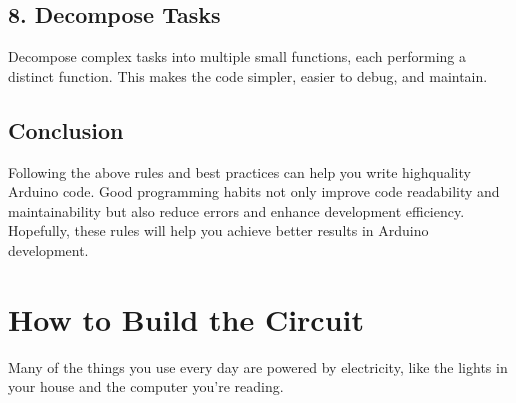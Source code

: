 \documentclass[a4paper,11pt,english]{sphinxmanual}
\begin{document}
\subsection{8. Decompose Tasks}
\label{\detokenize{Get_Started_with_Arduino/Sketch_Writing_Rules:decompose-tasks}}
\sphinxAtStartPar
Decompose complex tasks into multiple small functions, each performing a distinct function. This makes the code simpler, easier to debug, and maintain.

\begin{sphinxVerbatim}[commandchars=\\\{\}]


\end{sphinxVerbatim}


\subsection{Conclusion}
\label{\detokenize{Get_Started_with_Arduino/Sketch_Writing_Rules:conclusion}}
\sphinxAtStartPar
Following the above rules and best practices can help you write high\sphinxhyphen{}quality Arduino code. Good programming habits not only improve code readability and maintainability but also reduce errors and enhance development efficiency. Hopefully, these rules will help you achieve better results in Arduino development.

\sphinxstepscope


\section{How to Build the Circuit}
\label{\detokenize{Get_Started_with_Arduino/How_to_Build_the_Circuit:how-to-build-the-circuit}}\label{\detokenize{Get_Started_with_Arduino/How_to_Build_the_Circuit::doc}}
\sphinxAtStartPar
Many of the things you use every day are powered by electricity, like the lights in your house and the computer you’re reading.
\end{document}
